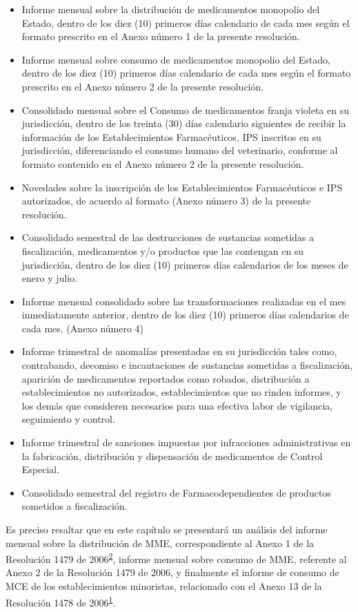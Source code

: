 \documentclass[
]{book}
\begin{document}
\begin{itemize}
\item
  Informe mensual sobre la distribución de medicamentos monopolio del Estado, dentro de los diez (10) primeros días calendario de cada mes según el formato prescrito en el Anexo número 1 de la presente resolución.
\item
  Informe mensual sobre consumo de medicamentos monopolio del Estado, dentro de los diez (10) primeros días calendario de cada mes según el formato prescrito en el Anexo número 2 de la presente resolución.
\item
  Consolidado mensual sobre el Consumo de medicamentos franja violeta en su jurisdicción, dentro de los treinta (30) días calendario siguientes de recibir la información de los Establecimientos Farmacéuticos, IPS inscritos en su jurisdicción, diferenciando el consumo humano del veterinario, conforme al formato contenido en el Anexo número 2 de la presente resolución.
\item
  Novedades sobre la inscripción de los Establecimientos Farmacéuticos e IPS autorizados, de acuerdo al formato (Anexo número 3) de la presente resolución.
\item
  Consolidado semestral de las destrucciones de sustancias sometidas a fiscalización, medicamentos y/o productos que las contengan en su jurisdicción, dentro de los diez (10) primeros días calendarios de los meses de enero y julio.
\item
  Informe mensual consolidado sobre las transformaciones realizadas en el mes inmediatamente anterior, dentro de los diez (10) primeros días calendarios de cada mes. (Anexo número 4)
\item
  Informe trimestral de anomalías presentadas en su jurisdicción tales como, contrabando, decomiso e incautaciones de sustancias sometidas a fiscalización, aparición de medicamentos reportados como robados, distribución a establecimientos no autorizados, establecimientos que no rinden informes, y los demás que consideren necesarios para una efectiva labor de vigilancia, seguimiento y control.
\item
  Informe trimestral de sanciones impuestas por infracciones administrativas en la fabricación, distribución y dispensación de medicamentos de Control Especial.
\item
  Consolidado semestral del registro de Farmacodependientes de productos sometidos a fiscalización.
\end{itemize}

Es preciso resaltar que en este capítulo se presentará un análisis del informe mensual sobre la distribución de MME, correspondiente al Anexo 1 de la Resolución 1479 de 2006\textsuperscript{\protect\hyperlink{ref-MSPS1479-2006}{2}}, informe mensual sobre consumo de MME, referente al Anexo 2 de la Resolución 1479 de 2006, y finalmente el informe de consumo de MCE de los establecimientos minoristas, relacionado con el Anexo 13 de la Resolución 1478 de 2006\textsuperscript{\protect\hyperlink{ref-MSPS1478-2006}{1}}.
\end{document}
